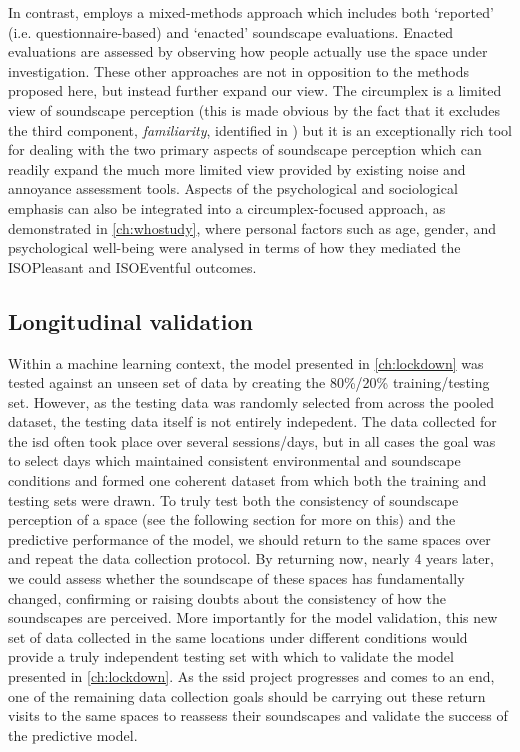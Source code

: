 In contrast, \citet{Bild2018Public} employs a mixed-methods approach which includes both `reported' (i.e. questionnaire-based) and `enacted' soundscape evaluations. Enacted evaluations are assessed by observing how people actually use the space under investigation. These other approaches are not in opposition to the methods proposed here, but instead further expand our view. The circumplex is a limited view of soundscape perception (this is made obvious by the fact that it excludes the third component, \emph{familiarity}, identified in \citet{Axelsson2010principal}) but it is an exceptionally rich tool for dealing with the two primary aspects of soundscape perception which can readily expand the much more limited view provided by existing noise and annoyance assessment tools. Aspects of the psychological and sociological emphasis can also be integrated into a circumplex-focused approach, as demonstrated in \cref{ch:whostudy}, where personal factors such as age, gender, and psychological well-being were analysed in terms of how they mediated the ISOPleasant and ISOEventful outcomes.

\subsection{Longitudinal validation}

Within a machine learning context, the model presented in \cref{ch:lockdown} was tested against an unseen set of data by creating the 80\%/20\% training/testing set. However, as the testing data was randomly selected from across the pooled dataset, the testing data itself is not entirely indepedent. The data collected for the \gls{isd} often took place over several sessions/days, but in all cases the goal was to select days which maintained consistent environmental and soundscape conditions and formed one coherent dataset from which both the training and testing sets were drawn. To truly test both the consistency of soundscape perception of a space (see the following section for more on this) and the predictive performance of the model, we should return to the same spaces over and repeat the data collection protocol. By returning now, nearly 4 years later, we could assess whether the soundscape of these spaces has fundamentally changed, confirming or raising doubts about the consistency of how the soundscapes are perceived. More importantly for the model validation, this new set of data collected in the same locations under different conditions would provide a truly independent testing set with which to validate the model presented in \cref{ch:lockdown}. As the \gls{ssid} project progresses and comes to an end, one of the remaining data collection goals should be carrying out these return visits to the same spaces to reassess their soundscapes and validate the success of the predictive model.

